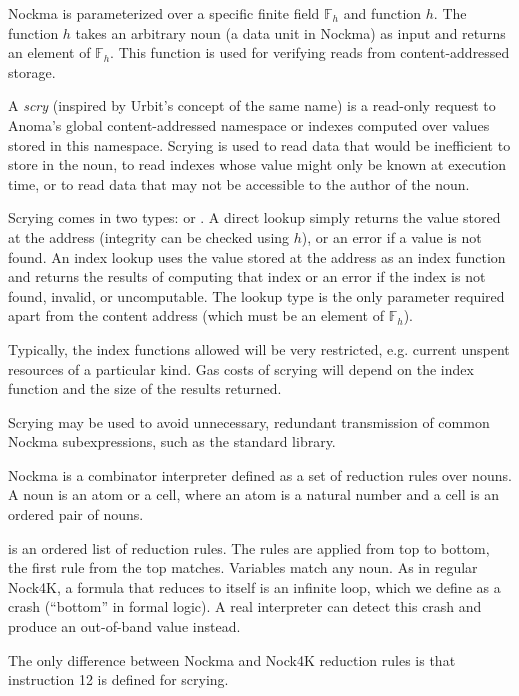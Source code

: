 Nockma is parameterized over a specific finite field $\mathbb{F}_h$ and function $h$. The function $h$ takes an arbitrary noun (a data unit in Nockma) as input and returns an element of $\mathbb{F}_h$. This function is used for verifying reads from content-addressed storage.

A \textit{scry} (inspired by Urbit’s concept of the same name) is a read-only request to Anoma’s global content-addressed namespace or indexes computed over values stored in this namespace. Scrying is used to read data that would be inefficient to store in the noun, to read indexes whose value might only be known at execution time, or to read data that may not be accessible to the author of the noun.

Scrying comes in two types:  or . A direct lookup simply returns the value stored at the address (integrity can be checked using $h$), or an error if a value is not found. An index lookup uses the value stored at the address as an index function and returns the results of computing that index or an error if the index is not found, invalid, or uncomputable. The lookup type is the only parameter required apart from the content address (which must be an element of $\mathbb{F}_h$).

Typically, the index functions allowed will be very restricted, e.g. current unspent resources of a particular kind. Gas costs of scrying will depend on the index function and the size of the results returned.

Scrying may be used to avoid unnecessary, redundant transmission of common Nockma subexpressions, such as the standard library.


Nockma is a combinator interpreter defined as a set of reduction rules over nouns. A noun is an atom or a cell, where an atom is a natural number and a cell is an ordered pair of nouns. 

 is an ordered list of reduction rules. The rules are applied from top to bottom, the first rule from the top matches. Variables match any noun. As in regular Nock4K, a formula that reduces to itself is an infinite loop, which we define as a crash (“bottom” in formal logic). A real interpreter can detect this crash and produce an out-of-band value instead.

The only difference between Nockma and Nock4K reduction rules is that instruction 12 is defined for scrying.

